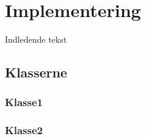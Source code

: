 \documentclass[../main.tex]{subfiles}
\begin{document}
\section{Implementering}

\flushleft
Indledende tekst


\subsection{Klasserne}

\subsubsection{Klasse1}

\subsubsection{Klasse2}
\end{document}

